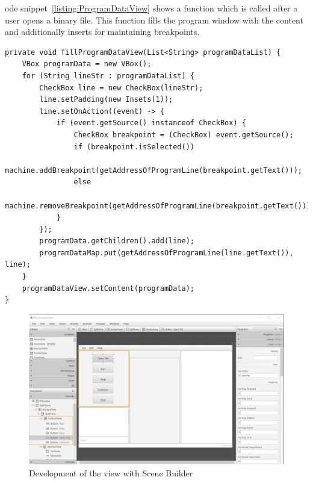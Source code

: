ode snippet~\ref{listing:ProgramDataView} shows a function which is called after a user opens a binary file. This function fills the program window with the content and additionally inserts  for  maintaining  breakpoints.

  
\begin{lstlisting}[caption={Implementation of program data view},label=listing:ProgramDataView]
private void fillProgramDataView(List<String> programDataList) {
    VBox programData = new VBox();
    for (String lineStr : programDataList) {
        CheckBox line = new CheckBox(lineStr);
        line.setPadding(new Insets(1));
        line.setOnAction((event) -> {
            if (event.getSource() instanceof CheckBox) {
                CheckBox breakpoint = (CheckBox) event.getSource();
                if (breakpoint.isSelected())
                    machine.addBreakpoint(getAddressOfProgramLine(breakpoint.getText()));
                else
                    machine.removeBreakpoint(getAddressOfProgramLine(breakpoint.getText()));
            }
        });
        programData.getChildren().add(line);
        programDataMap.put(getAddressOfProgramLine(line.getText()), line);
    }
    programDataView.setContent(programData);
}
\end{lstlisting}

\begin{figure}[h] 
	\centering
	\includegraphics[scale=.55]{images/view.png}
	\caption{Development of the view with Scene Builder}
	\label{fig:view}
\end{figure}
